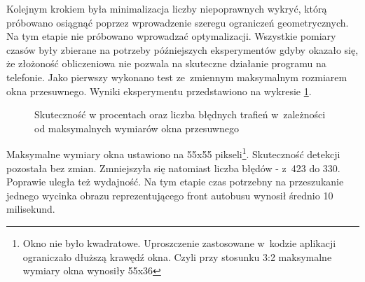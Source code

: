 Kolejnym krokiem była minimalizacja liczby niepoprawnych wykryć, którą
próbowano osiągnąć poprzez wprowadzenie szeregu ograniczeń geometrycznych. 
Na tym etapie nie próbowano wprowadzać optymalizacji. Wszystkie 
pomiary czasów były zbierane na potrzeby późniejszych eksperymentów
gdyby okazało się, że złożoność obliczeniowa nie pozwala na skuteczne
działanie programu na telefonie.
Jako pierwszy wykonano test ze~zmiennym maksymalnym rozmiarem 
okna przesuwnego. Wyniki eksperymentu przedstawiono na wykresie
\ref{chart:front_max2ratio}.

\begin{figure}[h!]\centering
	\begin{subfigure}{.49\linewidth}\centering
	\end{subfigure}	
	\hfill
	\begin{subfigure}{.49\linewidth}\centering
	\end{subfigure}
	\caption{Skuteczność w procentach oraz liczba błędnych trafień 
		w~zależności od maksymalnych wymiarów okna przesuwnego}
	\label{chart:front_max2ratio}
\end{figure}

Maksymalne wymiary okna ustawiono na 55x55 pikseli\footnote{Okno nie było
	kwadratowe. Uproszczenie zastosowane w~kodzie aplikacji ograniczało dłuższą krawędź
	okna. Czyli przy stosunku 3:2 maksymalne wymiary okna wynosiły 55x36}. Skuteczność detekcji pozostała
bez zmian. Zmniejszyła się natomiast liczba błędów - z~423 do 330. Poprawie
uległa też wydajność. 
Na tym etapie czas potrzebny na przeszukanie jednego wycinka obrazu
reprezentującego front autobusu wynosił średnio 10 milisekund.

